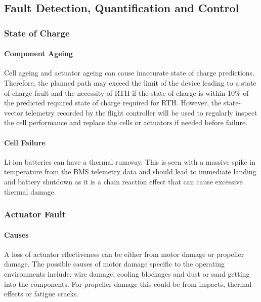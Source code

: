 \subsection{Fault Detection, Quantification and Control}\label{sub_section:tgt_fault_detection}

\subsubsection{State of Charge}\label{sub_sub_section:tgt_SOC}
\paragraph{Component Ageing}
Cell ageing and actuator ageing can cause inaccurate state of charge predictions. Therefore, the planned path may exceed the limit of the device leading to a state of charge fault and the necessity of \gls{RTH} if the state of charge is within 10\% of the predicted required state of charge required for \gls{RTH}. However, the state-vector telemetry recorded by the flight controller will be used to regularly inspect the cell performance and replace the cells or actuators if needed before failure.
\paragraph{Cell Failure}
\gls{Li-ion} batteries can have a thermal runaway. This is seen with a massive spike in temperature from the \gls{BMS} telemetry data and should lead to immediate landing and battery shutdown as it is a chain reaction effect that can cause excessive thermal damage\cite{LiONRunaway}.

\subsubsection{Actuator Fault}\label{sub_sub_section:tgt_actuator_fault}
\paragraph{Causes}
A loss of actuator effectiveness can be either from motor damage or propeller damage. The possible causes of motor damage specific to the operating environments include: wire damage, cooling blockages and dust or sand getting into the components. For propeller damage this could be from impacts, thermal effects or fatigue cracks.
